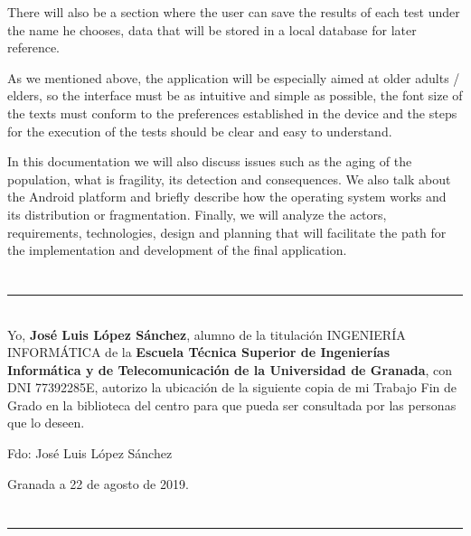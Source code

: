 There will also be a section where the user can save the results of each test under the name he chooses, data that will be stored in a local database for later reference.

As we mentioned above, the application will be especially aimed at older adults / elders, so the interface must be as intuitive and simple as possible, the font size of the texts must conform to the preferences established in the device and the steps for the execution of the tests should be clear and easy to understand.

In this documentation we will also discuss issues such as the aging of the population, what is fragility, its detection and consequences. We also talk about the Android platform and briefly describe how the operating system works and its distribution or fragmentation. Finally, we will analyze the actors, requirements, technologies, design and planning that will facilitate the path for the implementation and development of the final application.

\chapter*{}
\thispagestyle{empty}

\noindent\rule[-1ex]{\textwidth}{2pt}\\[4.5ex]

Yo, \textbf{José Luis López Sánchez}, alumno de la titulación INGENIERÍA INFORMÁTICA de la \textbf{Escuela Técnica Superior
de Ingenierías Informática y de Telecomunicación de la Universidad de Granada}, con DNI 77392285E, autorizo la
ubicación de la siguiente copia de mi Trabajo Fin de Grado en la biblioteca del centro para que pueda ser
consultada por las personas que lo deseen.

\vspace{6cm}

\noindent Fdo: José Luis López Sánchez

\vspace{2cm}

\begin{flushright}
Granada a 22 de agosto de 2019.
\end{flushright}


\chapter*{}
\thispagestyle{empty}

\noindent\rule[-1ex]{\textwidth}{2pt}\\[4.5ex]

